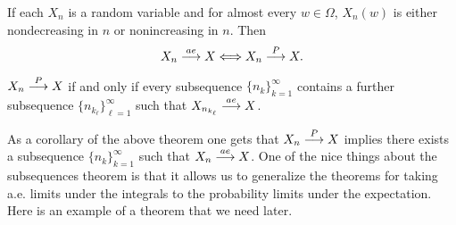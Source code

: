 \begin{theorem}
If each $X_n$ is a random variable and for almost every $w\in\Omega$, $X_n(w)$ is either nondecreasing in $n$ or nonincreasing in $n$. Then
\[ X_n \overset{\small ae} \longrightarrow X \Longleftrightarrow  X_n \overset{\small P} \longrightarrow X.\]
\end{theorem}





\begin{theorem}
$ X_n\overset{\small P} \longrightarrow X$ if and only if every subsequence $\{ n_k\}_{k=1}^\infty$ contains a further subsequence $\{ n_{k_\ell}\}_{\ell=1}^\infty$ such that $ X_{n_{k_\ell}}\overset{\small ae} \longrightarrow X$.
\end{theorem}


As a corollary of the above theorem one gets that  $ X_n\overset{\small P} \longrightarrow X$ implies there exists a subsequence $\{ n_k\}_{k=1}^\infty$ such that $ X_n\overset{\small ae} \longrightarrow X$. One of the nice things about the subsequences theorem is that it allows us to generalize the theorems for taking a.e. limits under the integrals to the probability limits under the expectation.  Here is an example of a theorem that we need later. 

